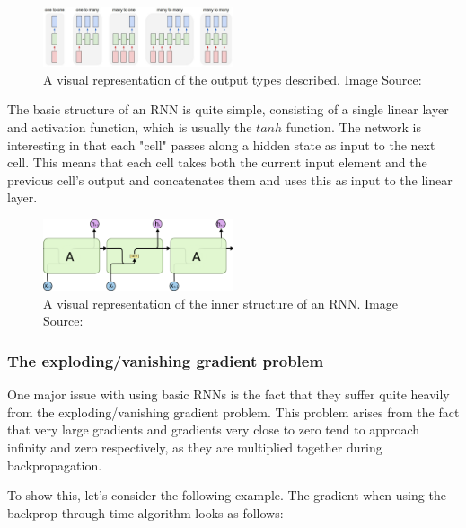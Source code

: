 \begin{figure}[h]
	\centering
		\includegraphics[width=0.5\textwidth]{latex/imgs/rnn_types.png}
  	\caption{A visual representation of the output types described. Image Source:\cite{rnn}}
\end{figure}

The basic structure of an RNN is quite simple, consisting of a single linear layer and activation function, which is usually the $tanh$ function. The network is interesting in that each "cell" passes along a hidden state as input to the next cell. This means that each cell takes both the current input element and the previous cell's output and concatenates them and uses this as input to the linear layer.

\begin{figure}[h]
	\centering
		\includegraphics[width=0.5\textwidth]{latex/imgs/rnn.png}
  	\caption{A visual representation of the inner structure of an RNN. Image Source:\cite{rnn}}
\end{figure}

\subsubsection{The exploding/vanishing gradient problem}
One major issue with using basic RNNs is the fact that they suffer quite heavily from the exploding/vanishing gradient problem. This problem arises from the fact that very large gradients and gradients very close to zero tend to approach infinity and zero respectively, as they are multiplied together during backpropagation.

To show this, let's consider the following example. The gradient when using the backprop through time algorithm looks as follows:

